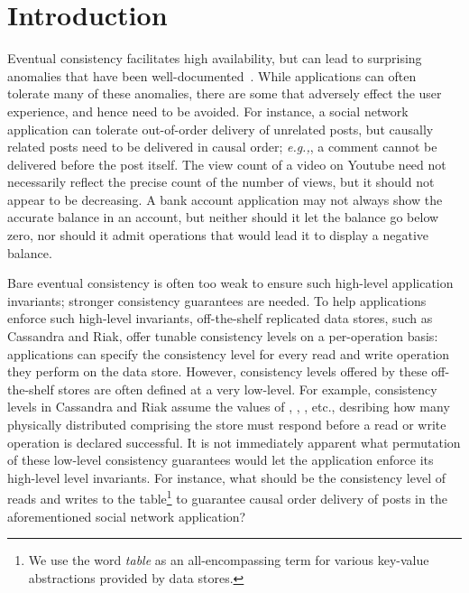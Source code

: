 \section{Introduction}
\label{sec:intro}

Eventual consistency facilitates high availability, but can lead to
surprising anomalies that have been
well-documented~\cite{Burckhardt2014, pldi15, Session, Dynamo,
  RedBlue}. While applications can often tolerate many of these
anomalies, there are some that adversely effect the user experience,
and hence need to be avoided. For instance, a social network
application can tolerate out-of-order delivery of unrelated posts, but
causally related posts need to be delivered in causal order;
\emph{e.g.,}, a comment cannot be delivered before the post
itself. The view count of a video on Youtube need not necessarily
reflect the precise count of the number of views, but it should not
appear to be decreasing. A bank account application may not always
show the accurate balance in an account, but neither should it let the
balance go below zero, nor should it admit operations that would
lead it to display a negative balance.

Bare eventual consistency is often too weak to ensure such high-level
application invariants; stronger consistency guarantees are needed. To
help applications enforce such high-level invariants, off-the-shelf
replicated data stores, such as Cassandra and Riak, offer tunable
consistency levels on a per-operation basis: applications can specify
the consistency level for every read and write operation they perform
on the data store. However, consistency levels offered by these
off-the-shelf stores are often defined at a very low-level. For
example, consistency levels in Cassandra and Riak assume the values of
, , ,  etc., desribing how many
physically distributed comprising the store must respond before a read
or write operation is declared successful.  It is not immediately
apparent what permutation of these low-level consistency guarantees
would let the application enforce its high-level level invariants. For
instance, what should be the consistency level of reads and writes to
the  table\footnote{We use the word \emph{table} as an
  all-encompassing term for various key-value abstractions provided by
  data stores.} to guarantee causal order delivery of posts in the
aforementioned social network application?

